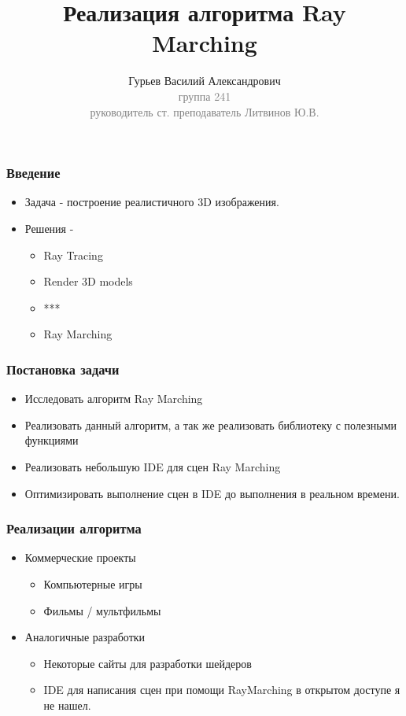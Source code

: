 \documentclass{beamer}
\begin{document}
\title{Реализация алгоритма Ray Marching}
\author{Гурьев Василий Александрович\\{\footnotesize\textcolor{gray}{группа 241\\руководитель ст. преподаватель Литвинов Ю.В.
}}}
\frame{\titlepage}

\begin{frame}\frametitle{Введение}
\begin{itemize}
    \item Задача - построение реалистичного 3D изображения.
    \item Решения -
    \begin{itemize}
        \item Ray Tracing
        \item Render 3D models
        \item ***
        \item Ray Marching
    \end{itemize}
\end{itemize}
\end{frame}

\begin{frame}\frametitle{Постановка задачи}
\begin{itemize}
    \item Исследовать алгоритм Ray Marching
    \item Реализовать данный алгоритм, а так же реализовать библиотеку с полезными функциями
    \item Реализовать небольшую IDE для сцен Ray Marching
    \item Оптимизировать выполнение сцен в IDE до выполнения в реальном времени.
\end{itemize}
\end{frame}

\begin{frame}\frametitle{Реализации алгоритма}
\begin{itemize}
    \item Коммерческие проекты
    \begin{itemize}
        \item Компьютерные игры
        \item Фильмы / мультфильмы
    \end{itemize}
    \item Аналогичные разработки
    \begin{itemize}
        \item Некоторые сайты для разработки шейдеров
        \item IDE для написания сцен при помощи RayMarching в открытом доступе я не нашел.
    \end{itemize}
\end{itemize}
\end{frame}
\end{document}
